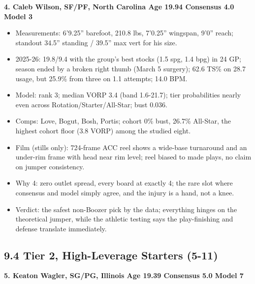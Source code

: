 \documentclass[
  10pt,
]{article}
\providecommand{\tightlist}{%
  \setlength{\itemsep}{0pt}\setlength{\parskip}{0pt}}
\begin{document}
\textbf{4. Caleb Wilson, SF/PF, North Carolina \textbar{} Age 19.94 \textbar{}
Consensus 4.0 \textbar{} Model 3}

\begin{itemize}
\tightlist
\item
  Measurements: 6'9.25'' barefoot, 210.8 lbs, 7'0.25'' wingspan, 9'0'' reach;
  standout 34.5'' standing / 39.5'' max vert for his size.
\item
  2025-26: 19.8/9.4 with the group's best stocks (1.5 spg, 1.4 bpg) in 24 GP;
  season ended by a broken right thumb (March 5 surgery); 62.6 TS\% on 28.7
  usage, but 25.9\% from three on 1.1 attempts; 14.0 BPM.
\item
  Model: rank 3; median VORP 3.4 (band 1.6-21.7); tier probabilities nearly even
  across Rotation/Starter/All-Star; bust 0.036.
\item
  Comps: Love, Bogut, Bosh, Portis; cohort 0\% bust, 26.7\% All-Star, the
  highest cohort floor (3.8 VORP) among the studied eight.
\item
  Film (stills only): 724-frame ACC reel shows a wide-base turnaround and an
  under-rim frame with head near rim level; reel biased to made plays, no claim
  on jumper consistency.
\item
  Why 4: zero outlet spread, every board at exactly 4; the rare slot where
  consensus and model simply agree, and the injury is a hand, not a knee.
\item
  Verdict: the safest non-Boozer pick by the data; everything hinges on the
  theoretical jumper, while the athletic testing says the play-finishing and
  defense translate immediately.
\end{itemize}

\subsection{9.4 Tier 2, High-Leverage Starters
(5-11)}\label{tier-2-high-leverage-starters-5-11}

\textbf{5. Keaton Wagler, SG/PG, Illinois \textbar{} Age 19.39 \textbar{}
Consensus 5.0 \textbar{} Model 7}
\end{document}
